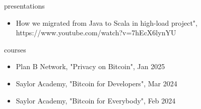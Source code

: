 \documentclass{resume}
\begin{document}
\begin{ResumeSection}{presentations}
    \begin{itemize}
        \item How we migrated from Java to Scala in high-load project", https://www.youtube.com/watch?v=7hEcX6lynYU
    \end{itemize}
\end{ResumeSection}

\bigskip

\begin{ResumeSection}{courses}
    \begin{itemize}
        \item Plan B Network, "Privacy on Bitcoin", Jan 2025
        \item Saylor Academy, "Bitcoin for Developers", Mar 2024
        \item Saylor Academy, "Bitcoin for Everybody", Feb 2024
    \end{itemize}
\end{ResumeSection}
\end{document}
